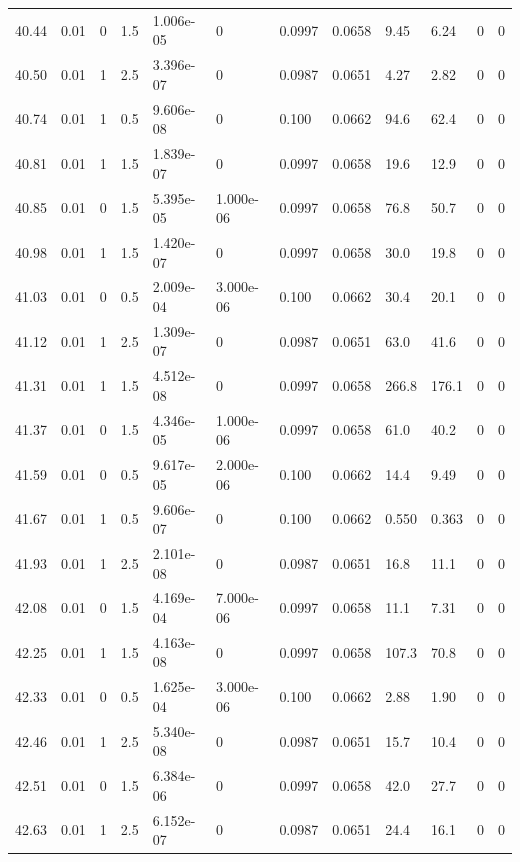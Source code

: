 \documentclass[preview]{standalone}
\begin{document}
{{{{{{{{{\begin{tabular}{L{1.2cm}C{1.2cm} C{0.3cm}C{0.5cm} C{1.4cm}C{1.4cm} C{1.4cm}C{1.4cm} C{1.6cm}C{1.6cm} C{1.6cm}C{1.6cm}}
  40.44  &  0.01  & 0     & 1.5 &  1.006e-05  & 0  &  0.0997&   0.0658& 9.45 & 6.24   &  0 & 0  \\ 
  40.50  &  0.01  & 1     & 2.5 &  3.396e-07  & 0  &  0.0987&   0.0651& 4.27 & 2.82   &  0 & 0  \\ 
  40.74  &  0.01  & 1     & 0.5 &  9.606e-08  & 0  &  0.100&   0.0662& 94.6 & 62.4   &  0 & 0  \\ 
  40.81  &  0.01  & 1     & 1.5 &  1.839e-07  & 0  &  0.0997&   0.0658& 19.6 & 12.9   &  0 & 0  \\ 
  40.85  &  0.01  & 0     & 1.5 &  5.395e-05  & 1.000e-06  &  0.0997&   0.0658& 76.8 & 50.7   &  0 & 0  \\ 
  40.98  &  0.01  & 1     & 1.5 &  1.420e-07  & 0  &  0.0997&   0.0658& 30.0 & 19.8   &  0 & 0  \\ 
  41.03  &  0.01  & 0     & 0.5 &  2.009e-04  & 3.000e-06  &  0.100&   0.0662& 30.4 & 20.1   &  0 & 0  \\ 
  41.12  &  0.01  & 1     & 2.5 &  1.309e-07  & 0  &  0.0987&   0.0651& 63.0 & 41.6   &  0 & 0  \\ 
  41.31  &  0.01  & 1     & 1.5 &  4.512e-08  & 0  &  0.0997&   0.0658& 266.8 & 176.1   &  0 & 0  \\ 
  41.37  &  0.01  & 0     & 1.5 &  4.346e-05  & 1.000e-06  &  0.0997&   0.0658& 61.0 & 40.2   &  0 & 0  \\ 
  41.59  &  0.01  & 0     & 0.5 &  9.617e-05  & 2.000e-06  &  0.100&   0.0662& 14.4 & 9.49   &  0 & 0  \\ 
  41.67  &  0.01  & 1     & 0.5 &  9.606e-07  & 0  &  0.100&   0.0662& 0.550 & 0.363   &  0 & 0  \\ 
  41.93  &  0.01  & 1     & 2.5 &  2.101e-08  & 0  &  0.0987&   0.0651& 16.8 & 11.1   &  0 & 0  \\ 
  42.08  &  0.01  & 0     & 1.5 &  4.169e-04  & 7.000e-06  &  0.0997&   0.0658& 11.1 & 7.31   &  0 & 0  \\ 
  42.25  &  0.01  & 1     & 1.5 &  4.163e-08  & 0  &  0.0997&   0.0658& 107.3 & 70.8   &  0 & 0  \\ 
  42.33  &  0.01  & 0     & 0.5 &  1.625e-04  & 3.000e-06  &  0.100&   0.0662& 2.88 & 1.90   &  0 & 0  \\ 
  42.46  &  0.01  & 1     & 2.5 &  5.340e-08  & 0  &  0.0987&   0.0651& 15.7 & 10.4   &  0 & 0  \\ 
  42.51  &  0.01  & 0     & 1.5 &  6.384e-06  & 0  &  0.0997&   0.0658& 42.0 & 27.7   &  0 & 0  \\ 
  42.63  &  0.01  & 1     & 2.5 &  6.152e-07  & 0  &  0.0987&   0.0651& 24.4 & 16.1   &  0 & 0  \\ 

\end{tabular}}}}}}}}}}
\end{document}
